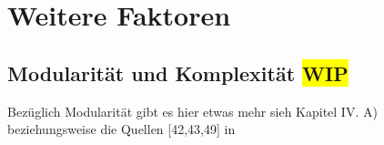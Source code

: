 
%










\newpage
\section{Weitere Faktoren} \label{sec:Weitere Faktoren}



\subsection{Modularität und Komplexität \colorbox{yellow}{WIP}}
Bezüglich Modularität gibt es hier etwas mehr \cite{marganSuccessOpenSource2015} sieh Kapitel IV. A)
beziehungsweise die Quellen [42,43,49] in \cite{marganSuccessOpenSource2015}


